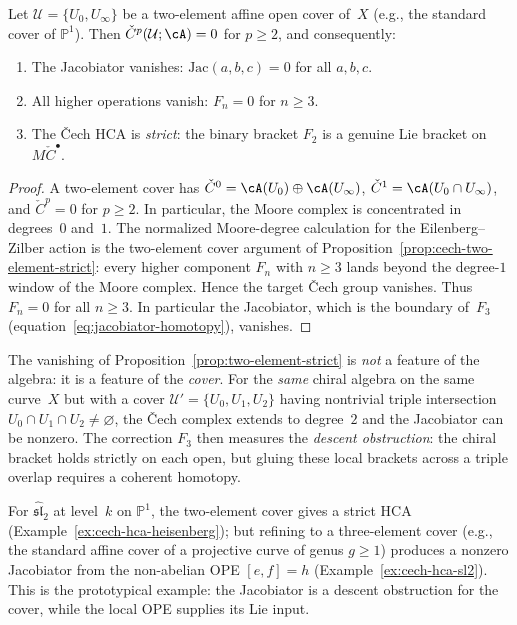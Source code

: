 \begin{proposition}
\label{prop:two-element-strict}
Let $\mathcal{U} = \{U_0, U_\infty\}$ be a two-element affine
open cover of~$X$ (e.g., the standard cover of
$\mathbb{P}^1$). Then
$\check{C}^p(\mathcal{U};\cA) = 0$ for $p \geq 2$,
and consequently:
\begin{enumerate}[label=\textup{(\roman*)}]
\item The Jacobiator vanishes:
 $\mathrm{Jac}(a,b,c) = 0$ for all $a,b,c$.
\item All higher operations vanish: $F_n = 0$ for $n \geq 3$.
\item The \v{C}ech HCA is \emph{strict}: the binary bracket
 $F_2$ is a genuine Lie bracket on $M\check{C}^\bullet$.
\end{enumerate}
\end{proposition}
\begin{proof}
A two-element cover has $\check{C}^0 = \cA(U_0) \oplus
\cA(U_\infty)$, $\check{C}^1 = \cA(U_0 \cap U_\infty)$,
and $\check{C}^p = 0$ for $p \geq 2$. In particular, the
Moore complex is concentrated in degrees~$0$ and~$1$. The
normalized Moore-degree calculation for the Eilenberg--Zilber action
is the two-element cover argument of
Proposition~\ref{prop:cech-two-element-strict}: every higher
component $F_n$ with $n\geq 3$ lands beyond the degree-$1$ window of
the Moore complex. Hence the target \v{C}ech group vanishes.
Thus $F_n = 0$ for all $n \geq 3$. In particular the Jacobiator,
which is the boundary of~$F_3$
(equation~\eqref{eq:jacobiator-homotopy}), vanishes.
\end{proof}

\begin{remark}
\label{rem:jacobiator-when-nonzero}
The vanishing of Proposition~\ref{prop:two-element-strict} is
\emph{not} a feature of the algebra: it is a feature of the
\emph{cover}. For the \emph{same} chiral algebra on the same
curve~$X$ but with a cover $\mathcal{U}' = \{U_0,U_1,U_2\}$
having nontrivial triple intersection
$U_0 \cap U_1 \cap U_2 \neq \varnothing$, the \v{C}ech complex
extends to degree~$2$ and the Jacobiator can be nonzero. The
correction $F_3$ then measures the \emph{descent obstruction}:
the chiral bracket holds strictly on each open, but gluing
these local brackets across a triple overlap requires a
coherent homotopy.

For $\widehat{\mathfrak{sl}}_2$ at level~$k$ on $\mathbb{P}^1$,
the two-element cover gives a strict HCA
(Example~\ref{ex:cech-hca-heisenberg}); but refining to a
three-element cover (e.g., the standard affine cover of a
projective curve of genus $g \geq 1$) produces a nonzero
Jacobiator from the non-abelian OPE $[e,f] = h$
(Example~\ref{ex:cech-hca-sl2}). This is the prototypical
example: the Jacobiator is a descent obstruction for the cover, while
the local OPE supplies its Lie input.
\end{remark}

